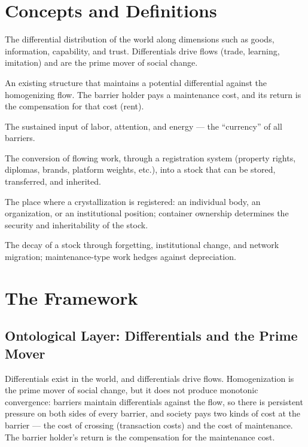 \documentclass[11pt]{article}
\begin{document}
\section{Concepts and Definitions}
\begin{description}[leftmargin=2.2em]
\item[Potential differential] The differential distribution of the world along dimensions such as goods, information, capability, and trust. Differentials drive flows (trade, learning, imitation) and are the prime mover of social change.
\item[Barrier] An existing structure that maintains a potential differential against the homogenizing flow. The barrier holder pays a maintenance cost, and its return is the compensation for that cost (rent).
\item[Work] The sustained input of labor, attention, and energy --- the ``currency'' of all barriers.
\item[Crystallization] The conversion of flowing work, through a registration system (property rights, diplomas, brands, platform weights, etc.), into a stock that can be stored, transferred, and inherited.
\item[Container] The place where a crystallization is registered: an individual body, an organization, or an institutional position; container ownership determines the security and inheritability of the stock.
\item[Depreciation] The decay of a stock through forgetting, institutional change, and network migration; maintenance-type work hedges against depreciation.
\end{description}

\section{The Framework}
\subsection{Ontological Layer: Differentials and the Prime Mover}
Differentials exist in the world, and differentials drive flows. Homogenization is the prime mover of social change, but it does not produce monotonic convergence: barriers maintain differentials against the flow, so there is persistent pressure on both sides of every barrier, and society pays two kinds of cost at the barrier --- the cost of crossing (transaction costs) and the cost of maintenance. The barrier holder's return is the compensation for the maintenance cost.
\end{document}
